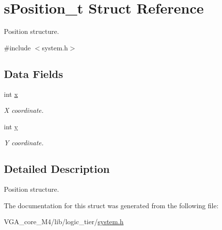 \hypertarget{structs_position__t}{}\section{s\+Position\+\_\+t Struct Reference}
\label{structs_position__t}


Position structure.  




{\ttfamily \#include $<$system.\+h$>$}

\subsection*{Data Fields}
\begin{DoxyCompactItemize}
\item 
int \hyperlink{structs_position__t_a6150e0515f7202e2fb518f7206ed97dc}{x}\hypertarget{structs_position__t_a6150e0515f7202e2fb518f7206ed97dc}{}\label{structs_position__t_a6150e0515f7202e2fb518f7206ed97dc}

\begin{DoxyCompactList}\small\item\em X coordinate. \end{DoxyCompactList}\item 
int \hyperlink{structs_position__t_a0a2f84ed7838f07779ae24c5a9086d33}{y}\hypertarget{structs_position__t_a0a2f84ed7838f07779ae24c5a9086d33}{}\label{structs_position__t_a0a2f84ed7838f07779ae24c5a9086d33}

\begin{DoxyCompactList}\small\item\em Y coordinate. \end{DoxyCompactList}\end{DoxyCompactItemize}


\subsection{Detailed Description}
Position structure. 

The documentation for this struct was generated from the following file\+:\begin{DoxyCompactItemize}
\item 
V\+G\+A\+\_\+core\+\_\+\+M4/lib/logic\+\_\+tier/\hyperlink{system_8h}{system.\+h}\end{DoxyCompactItemize}
